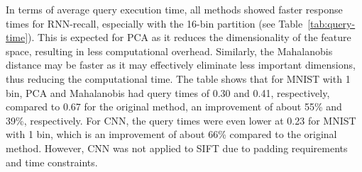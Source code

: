 \documentclass[sigconf, nonacm]{acmart}
\begin{document}
In terms of average query execution time, all methods showed faster response times for RNN-recall, especially with the 16-bin partition (see Table~\ref{tab:query-time}). This is expected for PCA as it reduces the dimensionality of the feature space, resulting in less computational overhead. Similarly, the Mahalanobis distance may be faster as it may effectively eliminate less important dimensions, thus reducing the computational time. The table shows that for MNIST with 1 bin, PCA and Mahalanobis had query times of 0.30 and 0.41, respectively, compared to 0.67 for the original method, an improvement of about 55\% and 39\%, respectively. For CNN, the query times were even lower at 0.23 for MNIST with 1 bin, which is an improvement of about 66\% compared to the original method. However, CNN was not applied to SIFT due to padding requirements and time constraints.
\end{document}
